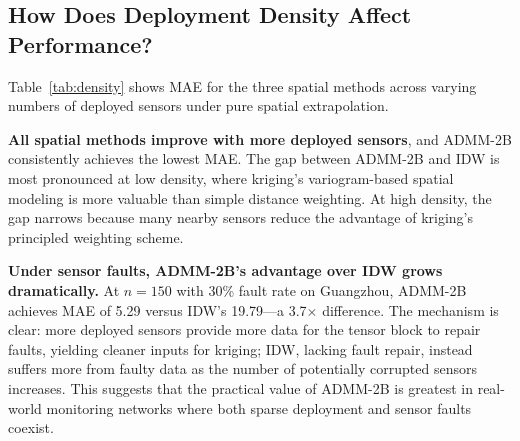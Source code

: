 \documentclass[journal]{IEEEtran}
\begin{document}
\subsection{How Does Deployment Density Affect Performance?}\label{sec:results_q4}

Table~\ref{tab:density} shows MAE for the three spatial methods across varying numbers of deployed sensors under pure spatial extrapolation.

\textbf{All spatial methods improve with more deployed sensors}, and ADMM-2B consistently achieves the lowest MAE. The gap between ADMM-2B and IDW is most pronounced at low density, where kriging's variogram-based spatial modeling is more valuable than simple distance weighting. At high density, the gap narrows because many nearby sensors reduce the advantage of kriging's principled weighting scheme.

\textbf{Under sensor faults, ADMM-2B's advantage over IDW grows dramatically.}
At $n = 150$ with 30\% fault rate on Guangzhou, ADMM-2B achieves MAE of 5.29 versus IDW's 19.79---a 3.7$\times$ difference. The mechanism is clear: more deployed sensors provide more data for the tensor block to repair faults, yielding cleaner inputs for kriging; IDW, lacking fault repair, instead suffers more from faulty data as the number of potentially corrupted sensors increases. This suggests that the practical value of ADMM-2B is greatest in real-world monitoring networks where both sparse deployment and sensor faults coexist.
\end{document}
